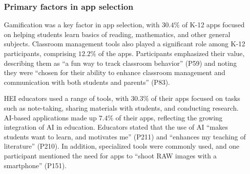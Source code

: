 \subsubsection{Primary factors in app selection}
\label{app_selection_factors}
Gamification was a key factor in app selection, with $30.4\%$ of K-12 apps focused on helping students
learn basics of reading, mathematics, and other general subjects.
Classroom management tools also played a significant role among K-12 participants, comprising $12.2\%$ of the apps.
Participants emphasized their value, describing them as ``a fun way to track classroom behavior'' (P59) and noting they were ``chosen for their ability to enhance classroom management and communication with both students and parents'' (P83).

HEI educators used a range of tools, with $30.3\%$ of their apps 
focused on tasks such as note-taking, sharing materials with students, and conducting research. 
AI-based applications made up $7.4\%$ of their apps, reflecting the growing integration of AI in education. 
Educators stated that the use of AI ``makes students want to learn, and motivates me'' (P211) and ``enhances my teaching of literature'' (P210).
In addition, specialized tools were commonly used, and one participant mentioned the need for apps to ``shoot RAW images with a smartphone'' (P151).





